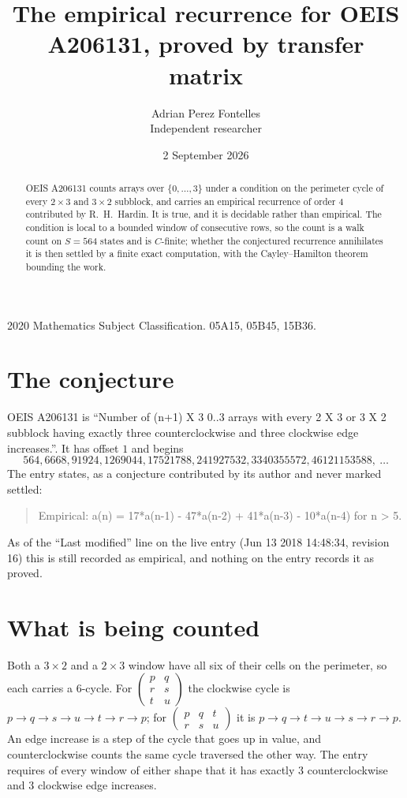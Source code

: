 \documentclass[11pt,a4paper]{article}
\title{The empirical recurrence for OEIS A206131, proved by transfer matrix}
\author{Adrian Perez Fontelles\\ \small Independent researcher}
\date{2 September 2026}
\theoremstyle{plain}
\theoremstyle{definition}
\begin{document}
\maketitle

\begin{abstract}
OEIS A206131 counts arrays over $\{0,\dots,3\}$ under a condition on the perimeter cycle of
every $2\times3$ and $3\times2$ subblock, and carries an empirical recurrence of order $4$ contributed by
R.~H.~Hardin. It is true, and it is decidable rather than empirical. The condition is local to
a bounded window of consecutive rows, so the count is a walk count on $S=564$ states and is
$C$-finite; whether the conjectured recurrence annihilates it is then settled by a finite exact
computation, with the Cayley--Hamilton theorem bounding the work.
\end{abstract}

\noindent\small 2020 Mathematics Subject Classification. 05A15, 05B45, 15B36.\normalsize

\section{The conjecture}

OEIS A206131 is ``Number of (n+1) X 3 0..3 arrays with every 2 X 3 or 3 X 2 subblock having exactly three counterclockwise and three clockwise edge increases.''. It has offset $1$ and begins
\[
564, 6668, 91924, 1269044, 17521788, 241927532, 3340355572, 46121153588,\ \dots
\]
The entry states, as a conjecture contributed by its author and never marked settled:
\begin{quote}
Empirical: a(n) = 17*a(n-1) - 47*a(n-2) + 41*a(n-3) - 10*a(n-4) for n > 5.
\end{quote}
As of the ``Last modified'' line on the live entry (Jun 13 2018 14:48:34, revision 16) this is still
recorded as empirical, and nothing on the entry records it as proved.

\section{What is being counted}

Both a $3\times2$ and a $2\times3$ window have all six of their cells on the
perimeter, so each carries a $6$-cycle. For
$\begin{pmatrix}p&q\\r&s\\t&u\end{pmatrix}$ the clockwise cycle is
$p\to q\to s\to u\to t\to r\to p$; for
$\begin{pmatrix}p&q&t\\r&s&u\end{pmatrix}$ it is
$p\to q\to t\to u\to s\to r\to p$. An edge increase is a step of the cycle that goes up in
value, and counterclockwise counts the same cycle traversed the other way. The entry requires
of every window of either shape that it has exactly $3$ counterclockwise and $3$ clockwise edge increases.
\end{document}
